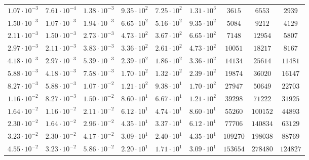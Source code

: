 \begin{tabular}{c c c c c c c c c}
$1.07{\cdot} 10^{-3}$ & $7.61{\cdot} 10^{-4}$ & $1.38{\cdot} 10^{-3}$ & $9.35{\cdot} 10^{2}$ & $7.25{\cdot} 10^{2}$ & $1.31{\cdot} 10^{3}$ & $      3615$ & $      6553$ & $   2939$\\
$1.50{\cdot} 10^{-3}$ & $1.07{\cdot} 10^{-3}$ & $1.94{\cdot} 10^{-3}$ & $6.65{\cdot} 10^{2}$ & $5.16{\cdot} 10^{2}$ & $9.35{\cdot} 10^{2}$ & $      5084$ & $      9212$ & $   4129$\\
$2.11{\cdot} 10^{-3}$ & $1.50{\cdot} 10^{-3}$ & $2.73{\cdot} 10^{-3}$ & $4.73{\cdot} 10^{2}$ & $3.67{\cdot} 10^{2}$ & $6.65{\cdot} 10^{2}$ & $      7148$ & $     12954$ & $   5807$\\
$2.97{\cdot} 10^{-3}$ & $2.11{\cdot} 10^{-3}$ & $3.83{\cdot} 10^{-3}$ & $3.36{\cdot} 10^{2}$ & $2.61{\cdot} 10^{2}$ & $4.73{\cdot} 10^{2}$ & $     10051$ & $     18217$ & $   8167$\\
$4.18{\cdot} 10^{-3}$ & $2.97{\cdot} 10^{-3}$ & $5.39{\cdot} 10^{-3}$ & $2.39{\cdot} 10^{2}$ & $1.86{\cdot} 10^{2}$ & $3.36{\cdot} 10^{2}$ & $     14134$ & $     25614$ & $  11481$\\
$5.88{\cdot} 10^{-3}$ & $4.18{\cdot} 10^{-3}$ & $7.58{\cdot} 10^{-3}$ & $1.70{\cdot} 10^{2}$ & $1.32{\cdot} 10^{2}$ & $2.39{\cdot} 10^{2}$ & $     19874$ & $     36020$ & $  16147$\\
$8.27{\cdot} 10^{-3}$ & $5.88{\cdot} 10^{-3}$ & $1.07{\cdot} 10^{-2}$ & $1.21{\cdot} 10^{2}$ & $9.38{\cdot} 10^{1}$ & $1.70{\cdot} 10^{2}$ & $     27947$ & $     50649$ & $  22703$\\
$1.16{\cdot} 10^{-2}$ & $8.27{\cdot} 10^{-3}$ & $1.50{\cdot} 10^{-2}$ & $8.60{\cdot} 10^{1}$ & $6.67{\cdot} 10^{1}$ & $1.21{\cdot} 10^{2}$ & $     39298$ & $     71222$ & $  31925$\\
$1.64{\cdot} 10^{-2}$ & $1.16{\cdot} 10^{-2}$ & $2.11{\cdot} 10^{-2}$ & $6.12{\cdot} 10^{1}$ & $4.74{\cdot} 10^{1}$ & $8.60{\cdot} 10^{1}$ & $     55260$ & $    100152$ & $  44893$\\
$2.30{\cdot} 10^{-2}$ & $1.64{\cdot} 10^{-2}$ & $2.96{\cdot} 10^{-2}$ & $4.35{\cdot} 10^{1}$ & $3.37{\cdot} 10^{1}$ & $6.12{\cdot} 10^{1}$ & $     77706$ & $    140834$ & $  63129$\\
$3.23{\cdot} 10^{-2}$ & $2.30{\cdot} 10^{-2}$ & $4.17{\cdot} 10^{-2}$ & $3.09{\cdot} 10^{1}$ & $2.40{\cdot} 10^{1}$ & $4.35{\cdot} 10^{1}$ & $    109270$ & $    198038$ & $  88769$\\
$4.55{\cdot} 10^{-2}$ & $3.23{\cdot} 10^{-2}$ & $5.86{\cdot} 10^{-2}$ & $2.20{\cdot} 10^{1}$ & $1.71{\cdot} 10^{1}$ & $3.09{\cdot} 10^{1}$ & $    153654$ & $    278480$ & $ 124827$\\

\end{tabular}

